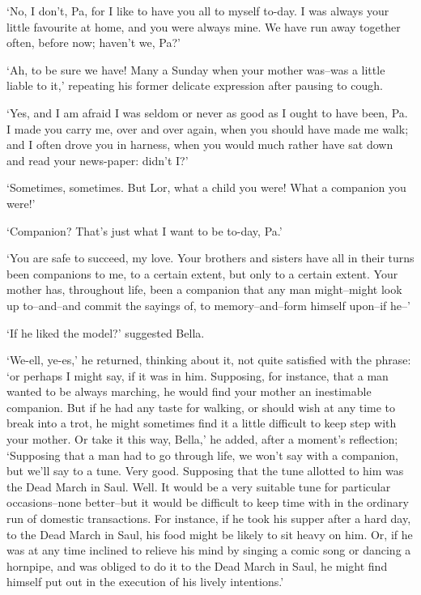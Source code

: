 ‘No, I don’t, Pa, for I like to have you all to myself to-day. I was
always your little favourite at home, and you were always mine. We have
run away together often, before now; haven’t we, Pa?’

‘Ah, to be sure we have! Many a Sunday when your mother was--was a
little liable to it,’ repeating his former delicate expression after
pausing to cough.

‘Yes, and I am afraid I was seldom or never as good as I ought to have
been, Pa. I made you carry me, over and over again, when you should
have made me walk; and I often drove you in harness, when you would much
rather have sat down and read your news-paper: didn’t I?’

‘Sometimes, sometimes. But Lor, what a child you were! What a companion
you were!’

‘Companion? That’s just what I want to be to-day, Pa.’

‘You are safe to succeed, my love. Your brothers and sisters have all
in their turns been companions to me, to a certain extent, but only to a
certain extent. Your mother has, throughout life, been a companion that
any man might--might look up to--and--and commit the sayings of, to
memory--and--form himself upon--if he--’

‘If he liked the model?’ suggested Bella.

‘We-ell, ye-es,’ he returned, thinking about it, not quite satisfied
with the phrase: ‘or perhaps I might say, if it was in him. Supposing,
for instance, that a man wanted to be always marching, he would find
your mother an inestimable companion. But if he had any taste for
walking, or should wish at any time to break into a trot, he might
sometimes find it a little difficult to keep step with your mother.
Or take it this way, Bella,’ he added, after a moment’s reflection;
‘Supposing that a man had to go through life, we won’t say with a
companion, but we’ll say to a tune. Very good. Supposing that the tune
allotted to him was the Dead March in Saul. Well. It would be a very
suitable tune for particular occasions--none better--but it would
be difficult to keep time with in the ordinary run of domestic
transactions. For instance, if he took his supper after a hard day, to
the Dead March in Saul, his food might be likely to sit heavy on him.
Or, if he was at any time inclined to relieve his mind by singing a
comic song or dancing a hornpipe, and was obliged to do it to the Dead
March in Saul, he might find himself put out in the execution of his
lively intentions.’

